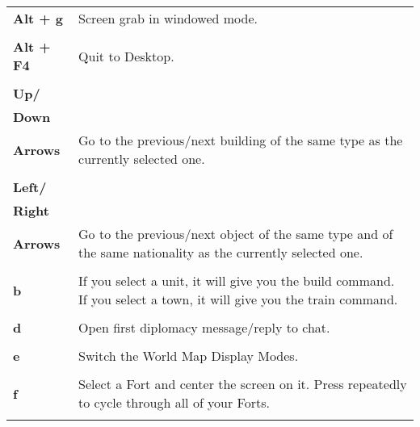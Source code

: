 \begin{longtable}{p{1in} p{3in}}
    \textbf{Alt + g} & Screen grab in windowed mode.\\ \\
%
    \textbf{Alt + F4} & Quit to Desktop.\\ \\
    \textbf{Up/}\\
    \textbf{Down}\\
    \textbf{Arrows} & Go to the previous/next building of the same type as the currently selected one.\\ \\    
    \textbf{Left/}\\
    \textbf{Right}\\
    \textbf{Arrows} & Go to the previous/next object of the same type and of the same nationality as the currently selected one.\\ \\
%
    \textbf{b} & If you select a unit, it will give you the build command. If you select a town, it will give you the train command.\\ \\
    \textbf{d} & Open first diplomacy message/reply to chat.\\ \\
    \textbf{e} & Switch the World Map Display Modes.\\ \\
    \textbf{f} & Select a Fort and center the screen on it. Press repeatedly to cycle through all of your Forts. \\ \\

        

\end{longtable}
